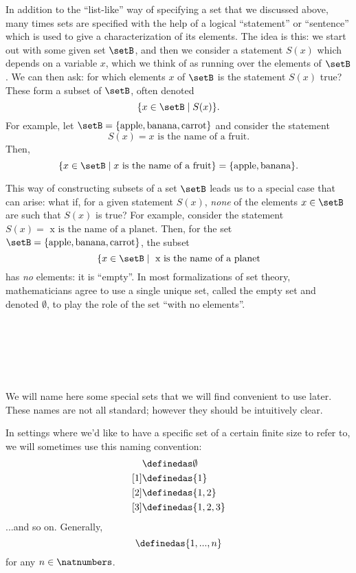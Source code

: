 {In addition to the ``list-like'' way of specifying a set that we discussed above, many times sets are specified with the help of a logical ``statement'' or ``sentence'' which is used to give a characterization of its elements. The idea is this: we start out with some given set $\setB$, and then we consider a statement $S(x)$ which depends on a variable $x$, which we think of as running over the elements of $\setB$. We can then ask: for which elements $x$ of $\setB$ is the statement $S(x)$ true? These form a subset of $\setB$, often denoted 
\begin{equation}
\{ x \in \setB \mid S(x) \}.
\end{equation}
For example, let $\setB = \{ \text{apple}, \text{banana}, \text{carrot} \}$ and consider the statement 
\begin{equation}
S(x) = x \text{ is the name of a fruit}.
\end{equation}
Then, 
\begin{equation}
\{ x \in \setB \mid x \text{ is the name of a fruit} \} = \{ \text{apple}, \text{banana} \}.
\end{equation}

This way of constructing subsets of a set $\setB$ leads us to a special case that can arise: what if, for a given statement $S(x)$, \emph{none} of the elements $x \in \setB$ are such that $S(x)$ is true? For example, consider the statement $S(x) = \text{ x is the name of a planet}$. Then, for the set $\setB = \{ \text{apple}, \text{banana}, \text{carrot} \}$, the subset 
\begin{equation}
\{ x \in \setB \mid \text{ x is the name of a planet}
\end{equation}
has \emph{no} elements: it is ``empty''. In most formalizations of set theory, mathematicians agree to use a single unique set, called the empty set and denoted $\emptyset$, to play the role of the set ``with no elements''. 


\

\



\


We will name here some special sets that we will find convenient to use later. These names are not all standard; however they should be intuitively clear.

In settings where we'd like to have a specific set of a certain finite size to refer to, we will sometimes use this naming convention:
\begin{align*}
[0]
  & \definedas \emptyset \\
  [1] & \definedas \{ 1\} \\
  [2] & \definedas \{ 1, 2\} \\
  [3] & \definedas \{ 1, 2, 3\}
\end{align*}
...and so on. Generally,
\begin{equation}
[n]
  \definedas \{ 1, ..., n\}
\end{equation}
for any $n \in \natnumbers$.}



\clearpage
